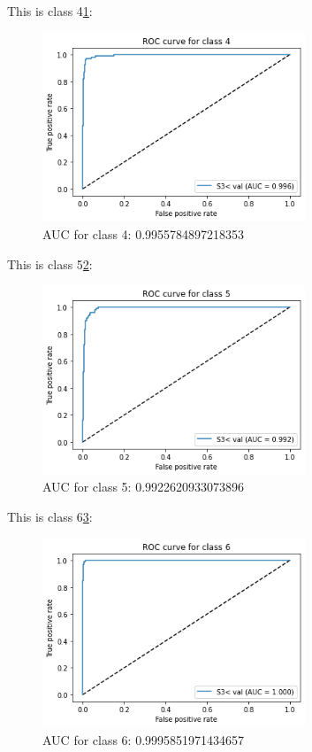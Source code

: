 \documentclass[conference]{IEEEtran}
\begin{document}
This is class 4\ref{Fig.ROC4}:
\begin{figure}[H] 
    \centering %
    \includegraphics[width=0.7\textwidth]{ROC4.png} %
    \caption{AUC for class 4:  0.9955784897218353} %
    \label{Fig.ROC4} %
\end{figure}
This is class 5\ref{Fig.ROC5}:
\begin{figure}[H] 
    \centering %
    \includegraphics[width=0.7\textwidth]{ROC5.png} %
    \caption{AUC for class 5:  0.9922620933073896} %
    \label{Fig.ROC5} %
\end{figure}
This is class 6\ref{Fig.ROC6}:
\begin{figure}[H] 
    \centering %
    \includegraphics[width=0.7\textwidth]{ROC6.png} %
    \caption{AUC for class 6:  0.9995851971434657} %
    \label{Fig.ROC6} %
\end{figure}
\end{document}

